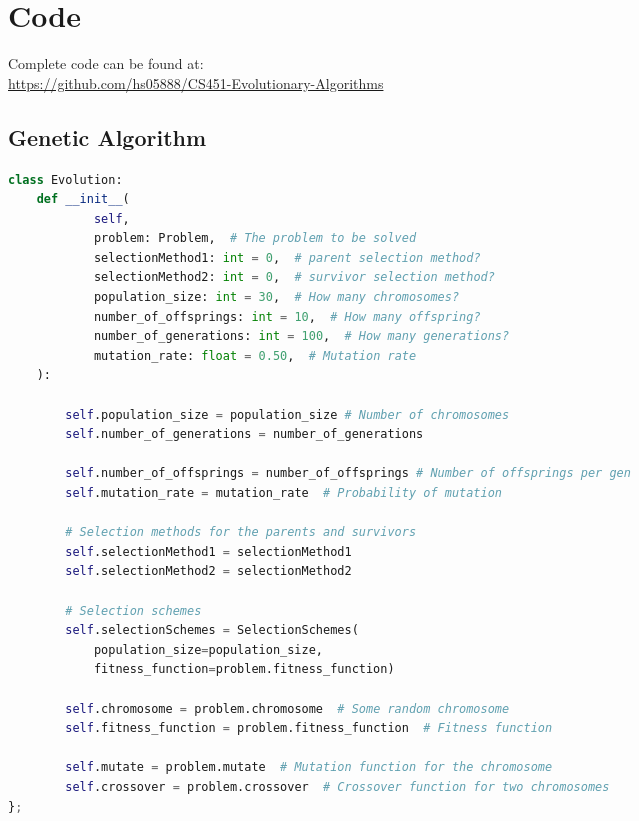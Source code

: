 \documentclass[12pt]{report} %
\begin{document}
\chapter{Code}
Complete code can be found at:\\
\url{https://github.com/hs05888/CS451-Evolutionary-Algorithms}
\section{Genetic Algorithm}

\begin{changemargin}{-3cm}{-2cm}


	\begin{lstlisting}[language=python, caption= {Initializing the evolution class with attributes}, captionpos=b]
class Evolution:
    def __init__(
            self,
            problem: Problem,  # The problem to be solved
            selectionMethod1: int = 0,  # parent selection method?
            selectionMethod2: int = 0,  # survivor selection method?
            population_size: int = 30,  # How many chromosomes?
            number_of_offsprings: int = 10,  # How many offspring?
            number_of_generations: int = 100,  # How many generations?
            mutation_rate: float = 0.50,  # Mutation rate
    ):
    
        self.population_size = population_size # Number of chromosomes
        self.number_of_generations = number_of_generations

        self.number_of_offsprings = number_of_offsprings # Number of offsprings per gen
        self.mutation_rate = mutation_rate  # Probability of mutation

        # Selection methods for the parents and survivors
        self.selectionMethod1 = selectionMethod1
        self.selectionMethod2 = selectionMethod2
        
        # Selection schemes
        self.selectionSchemes = SelectionSchemes(
            population_size=population_size,
            fitness_function=problem.fitness_function)
            
        self.chromosome = problem.chromosome  # Some random chromosome
        self.fitness_function = problem.fitness_function  # Fitness function
        
        self.mutate = problem.mutate  # Mutation function for the chromosome
        self.crossover = problem.crossover  # Crossover function for two chromosomes
};
\end{lstlisting}
\end{changemargin}
\end{document}
